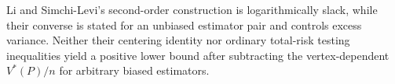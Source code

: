 Li and Simchi-Levi's second-order construction is logarithmically slack, while their converse is stated for an unbiased estimator pair and controls excess variance.  Neither their centering identity nor ordinary total-risk testing inequalities yield a positive lower bound after subtracting the vertex-dependent \(V^*(P)/n\) for arbitrary biased estimators.
